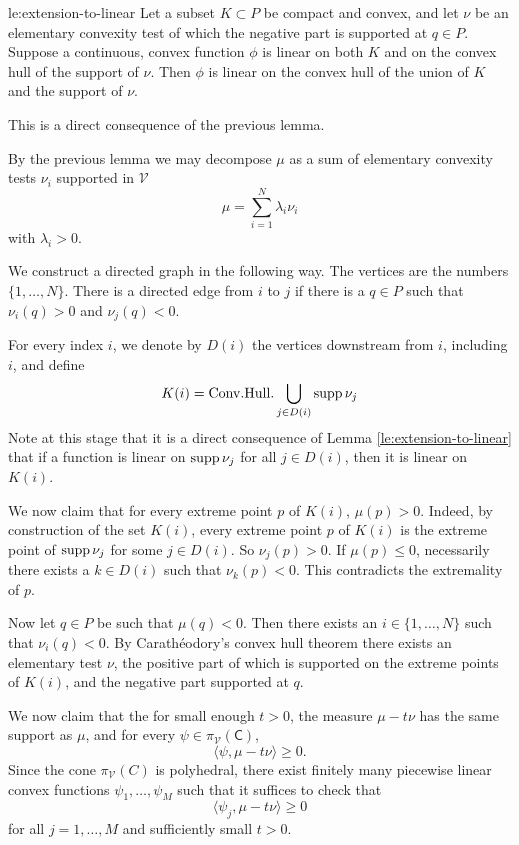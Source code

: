 \documentclass[12pt]{amsart}
\begin{document}
\begin{lemma}{le:extension-to-linear}
Let a subset $K \subset P$ be compact and convex, and let $\nu$ be an elementary convexity test of which the negative part is supported at $q \in P$. Suppose a continuous, convex function $\phi$ is linear on both $K$ and on the convex hull of the support of $\nu$. Then $\phi$ is linear on the convex hull of the union of $K$ and the support of $\nu$.
\end{lemma}

\begin{Proof}
This is a direct consequence of the previous lemma.
\end{Proof}

\begin{Proof}
By the previous lemma we may decompose $\mu$ as a sum of elementary convexity tests $\nu_i$ supported in $\mathcal{V}$
\[
\mu = \sum_{i=1}^N \lambda_i \nu_i
\]
with $\lambda_i > 0$. 

We construct a directed graph in the following way. 
The vertices are the numbers $\{1, \dots, N \}$. 
There is a directed edge from $i$ to $j$ if there is a $q \in P$ such that $\nu_i(q) > 0$ and $\nu_j(q) < 0$. 

For every index $i$, we denote by $D(i)$ the vertices downstream from $i$, including $i$, and define
\[
K(i) = \mathrm{Conv.Hull.} \bigcup_{j \in D(i)} \operatorname{\mathrm{supp}} \nu_j
\]
Note at this stage that it is a direct consequence of Lemma \ref{le:extension-to-linear} that if a function is linear on $\operatorname{\mathrm{supp}} \nu_j$ for all $j \in D(i)$, then it is linear on $K(i)$.

We now claim that for every extreme point $p$ of $K(i)$, $\mu(p) > 0$. Indeed, by construction of the set $K(i)$, every extreme point $p$ of $K(i)$ is the extreme point of $\operatorname{\mathrm{supp}} \nu_j$ for some $j \in D(i)$. So $\nu_j(p) > 0$. If $\mu(p) \leq 0$, necessarily there exists a $k \in D(i)$ such that $\nu_k(p) < 0$. This contradicts the extremality of $p$.

Now let $q \in P$ be such that $\mu(q) < 0$. Then there exists an $i \in \{1, \dots, N\}$ such that $\nu_i(q) < 0$. By Carath\'eodory's convex hull theorem there exists an elementary test $\nu$, the positive part of which is supported on the extreme points of $K(i)$, and the negative part supported at $q$. 

We now claim that the for small enough $t > 0$, the measure $\mu - t \nu$ has the same support as $\mu$, and for every $\psi \in \pi_{\mathcal{V}}(\mathsf{C})$,
\[
\langle \psi, \mu - t \nu \rangle \geq 0.
\]
Since the cone $\pi_{\mathcal{V}}(C)$ is polyhedral, there exist finitely many piecewise linear convex functions $\psi_1, \dots , \psi_M$ such that it suffices to check that
\[
\langle \psi_j, \mu - t \nu \rangle \geq 0
\]
for all $j =1, \dots, M$ and sufficiently small $t > 0$.


\end{Proof}
\end{document}
